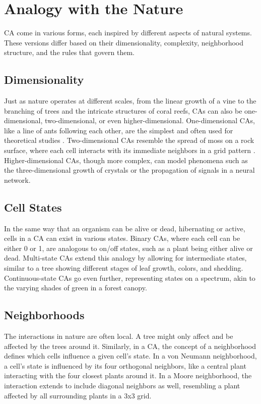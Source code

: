 \documentclass[9pt,a4paper,twoside]{tau-class/tau}
\begin{document}
\section{Analogy with the Nature}
    
CA come in various forms, each inspired by different aspects of natural systems. These versions differ based on their dimensionality, complexity, neighborhood structure, and the rules that govern them.

\subsection{Dimensionality}

Just as nature operates at different scales, from the linear growth of a vine to the branching of trees and the intricate structures of coral reefs, CAs can also be one-dimensional, two-dimensional, or even higher-dimensional. One-dimensional CAs, like a line of ants following each other, are the simplest and often used for theoretical studies \cite{wolfram2002}. Two-dimensional CAs resemble the spread of moss on a rock surface, where each cell interacts with its immediate neighbors in a grid pattern \cite{gardner1970}. Higher-dimensional CAs, though more complex, can model phenomena such as the three-dimensional growth of crystals or the propagation of signals in a neural network.

\subsection{Cell States}

In the same way that an organism can be alive or dead, hibernating or active, cells in a CA can exist in various states. Binary CAs, where each cell can be either 0 or 1, are analogous to on/off states, such as a plant being either alive or dead. Multi-state CAs extend this analogy by allowing for intermediate states, similar to a tree showing different stages of leaf growth, colors, and shedding. Continuous-state CAs go even further, representing states on a spectrum, akin to the varying shades of green in a forest canopy.

\subsection{Neighborhoods}

The interactions in nature are often local. A tree might only affect and be affected by the trees around it. Similarly, in a CA, the concept of a neighborhood defines which cells influence a given cell's state. In a von Neumann neighborhood, a cell's state is influenced by its four orthogonal neighbors, like a central plant interacting with the four closest plants around it. In a Moore neighborhood, the interaction extends to include diagonal neighbors as well, resembling a plant affected by all surrounding plants in a 3x3 grid.
\end{document}
